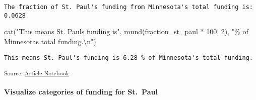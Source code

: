 \documentclass[
  letterpaper,
  DIV=11,
  numbers=noendperiod]{scrartcl}
\let\oldparagraph\paragraph
\renewcommand{\paragraph}[1]{\oldparagraph{#1}\mbox{}}
\newenvironment{Shaded}{\begin{snugshade}}{\end{snugshade}}
\newcommand{\DecValTok}[1]{\textcolor[rgb]{0.68,0.00,0.00}{#1}}
\newcommand{\FunctionTok}[1]{\textcolor[rgb]{0.28,0.35,0.67}{#1}}
\newcommand{\NormalTok}[1]{\textcolor[rgb]{0.00,0.23,0.31}{#1}}
\newcommand{\SpecialCharTok}[1]{\textcolor[rgb]{0.37,0.37,0.37}{#1}}
\newcommand{\StringTok}[1]{\textcolor[rgb]{0.13,0.47,0.30}{#1}}
\begin{document}
\begin{verbatim}
The fraction of St. Paul's funding from Minnesota's total funding is:  0.0628 
\end{verbatim}

\begin{Shaded}
\begin{Highlighting}[]
\FunctionTok{cat}\NormalTok{(}\StringTok{"This means St. Paul\textquotesingle{}s funding is"}\NormalTok{, }\FunctionTok{round}\NormalTok{(fraction\_st\_paul }\SpecialCharTok{*} \DecValTok{100}\NormalTok{, }\DecValTok{2}\NormalTok{), }\StringTok{"\% of Minnesota\textquotesingle{}s total funding.}\SpecialCharTok{\textbackslash{}n}\StringTok{"}\NormalTok{)}
\end{Highlighting}
\end{Shaded}

\begin{verbatim}
This means St. Paul's funding is 6.28 % of Minnesota's total funding.
\end{verbatim}

\textsubscript{Source:
\href{https://beeckcenter.github.io/climate-equity-workforce/index-preview.html}{Article
Notebook}}

\paragraph{Visualize categories of funding for
St.~Paul}\label{visualize-categories-of-funding-for-st.-paul}
\end{document}
